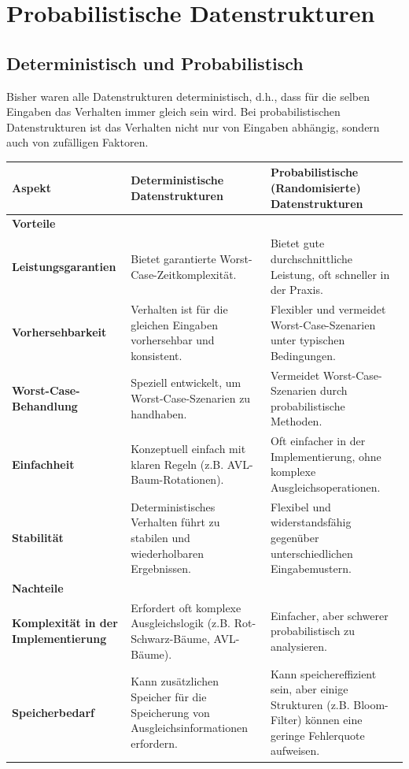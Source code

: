 \documentclass[
../AuD-Zusammenfassung.tex,
]
{subfiles}
\begin{document}
\section{Probabilistische Datenstrukturen}
\subsection{Deterministisch und Probabilistisch}
Bisher waren alle Datenstrukturen deterministisch, d.h., dass für die selben Eingaben das Verhalten immer gleich sein wird. Bei probabilistischen Datenstrukturen ist das Verhalten nicht nur von Eingaben abhängig, sondern auch von zufälligen Faktoren. 
\begin{longtable}{| p{4cm} | p{6cm} | p{6cm} |}
    \hline
    \rowcolor{backcolour}\textbf{Aspekt} & \textbf{Deterministische Datenstrukturen} & \textbf{Probabilistische (Randomisierte) Datenstrukturen} \\
    \hline
    \rowcolor{codegreen!30}\textbf{Vorteile} & & \\
    \hline
    \textbf{Leistungsgarantien} & Bietet garantierte Worst-Case-Zeitkomplexität. & Bietet gute durchschnittliche Leistung, oft schneller in der Praxis. \\
    \hline
    \textbf{Vorhersehbarkeit} & Verhalten ist für die gleichen Eingaben vorhersehbar und konsistent. & Flexibler und vermeidet Worst-Case-Szenarien unter typischen Bedingungen. \\
    \hline
    \textbf{Worst-Case-Behandlung} & Speziell entwickelt, um Worst-Case-Szenarien zu handhaben. & Vermeidet Worst-Case-Szenarien durch probabilistische Methoden. \\
    \hline
    \textbf{Einfachheit} & Konzeptuell einfach mit klaren Regeln (z.B. AVL-Baum-Rotationen). & Oft einfacher in der Implementierung, ohne komplexe Ausgleichsoperationen. \\
    \hline
    \textbf{Stabilität} & Deterministisches Verhalten führt zu stabilen und wiederholbaren Ergebnissen. & Flexibel und widerstandsfähig gegenüber unterschiedlichen Eingabemustern. \\
    \hline
    \rowcolor{magenta!30}\textbf{Nachteile} & & \\
    \hline
    \textbf{Komplexität in der Implementierung} & Erfordert oft komplexe Ausgleichslogik (z.B. Rot-Schwarz-Bäume, AVL-Bäume). & Einfacher, aber schwerer probabilistisch zu analysieren. \\
    \hline
    \textbf{Speicherbedarf} & Kann zusätzlichen Speicher für die Speicherung von Ausgleichsinformationen erfordern. & Kann speichereffizient sein, aber einige Strukturen (z.B. Bloom-Filter) können eine geringe Fehlerquote aufweisen. \\

\end{longtable}
\end{document}
